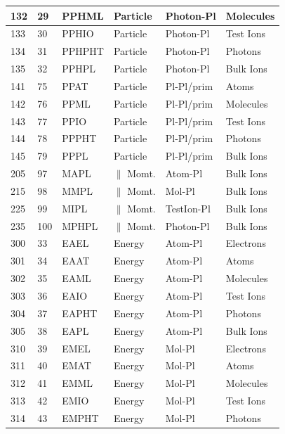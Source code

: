 \documentclass{article}
\begin{document}
\begin{longtable}{|l|l|l|l|l|l|}
132  & 29       & PPHML  & Particle & Photon-Pl  & Molecules  \\ \hline
133  & 30       & PPHIO  & Particle & Photon-Pl  & Test Ions  \\ \hline
134  & 31       & PPHPHT & Particle & Photon-Pl  & Photons    \\ \hline
135  & 32       & PPHPL  & Particle & Photon-Pl  & Bulk Ions  \\ \hline
141  & 75       & PPAT   & Particle & Pl-Pl/prim & Atoms      \\ \hline
142  & 76       & PPML   & Particle & Pl-Pl/prim & Molecules  \\ \hline
143  & 77       & PPIO   & Particle & Pl-Pl/prim & Test Ions  \\ \hline
144  & 78       & PPPHT  & Particle & Pl-Pl/prim & Photons    \\ \hline
145  & 79       & PPPL   & Particle & Pl-Pl/prim & Bulk Ions  \\ \hline
205  & 97       & MAPL   & $\|$ Momt. & Atom-Pl    & Bulk Ions  \\ \hline
215  & 98       & MMPL   & $\|$ Momt. & Mol-Pl     & Bulk Ions  \\ \hline
225  & 99       & MIPL   & $\|$ Momt. & TestIon-Pl & Bulk Ions  \\ \hline
235  & 100      & MPHPL  & $\|$ Momt. & Photon-Pl  & Bulk Ions  \\ \hline
300  & 33       & EAEL   & Energy   & Atom-Pl    & Electrons  \\ \hline
301  & 34       & EAAT   & Energy   & Atom-Pl    & Atoms      \\ \hline
302  & 35       & EAML   & Energy   & Atom-Pl    & Molecules  \\ \hline
303  & 36       & EAIO   & Energy   & Atom-Pl    & Test Ions  \\ \hline
304  & 37       & EAPHT  & Energy   & Atom-Pl    & Photons    \\ \hline
305  & 38       & EAPL   & Energy   & Atom-Pl    & Bulk Ions  \\ \hline
310  & 39       & EMEL   & Energy   & Mol-Pl     & Electrons  \\ \hline
311  & 40       & EMAT   & Energy   & Mol-Pl     & Atoms      \\ \hline
312  & 41       & EMML   & Energy   & Mol-Pl     & Molecules  \\ \hline
313  & 42       & EMIO   & Energy   & Mol-Pl     & Test Ions  \\ \hline
314  & 43       & EMPHT  & Energy   & Mol-Pl     & Photons    \\ \hline

\end{longtable}
\end{document}
